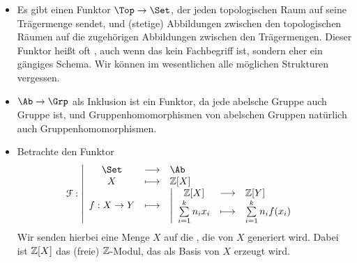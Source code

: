 \begin{example}
    \begin{itemize}
        \item Es gibt einen Funktor $\Top \to  \Set$, der jeden topologischen Raum auf seine Trägermenge sendet, und (stetige) Abbildungen zwischen den topologischen Räumen auf die zugehörigen Abbildungen zwischen den Trägermengen. Dieser Funktor heißt oft , auch wenn das kein Fachbegriff ist, sondern eher ein gängiges Schema. Wir können im wesentlichen alle möglichen Strukturen vergessen. 
        \item $\Ab \to  \Grp$ als Inklusion ist ein Funktor, da jede abelsche Gruppe auch Gruppe ist, und Gruppenhomomorphismen von abelschen Gruppen natürlich auch Gruppenhomomorphismen.
        \item Betrachte den Funktor
                \begin{equation*}
                \mathcal{F}: \left| \begin{array}{c c l} 
                \Set & \longrightarrow & \Ab \\
                X & \longmapsto &  \Z[X] \\
                f: X \to  Y &\longmapsto & 
                    \left| \begin{array}{c c l} 
                        \Z[X] & \longrightarrow & \Z[Y] \\
                        \sum\limits_{i=1}^k n_i x_i& \longmapsto	 & \sum\limits_{i=1}^k n_i f(x_i)
                \end{array} \right.
                
                \end{array} \right.
            \end{equation*}
            Wir senden hierbei eine Menge $X$ auf die  , die von $X$ generiert wird. Dabei ist $\mathbb{Z}[X]$ das (freie) $\mathbb{Z}$-Modul, das als Basis  von $X$ erzeugt wird.
    \end{itemize}
\end{example}

